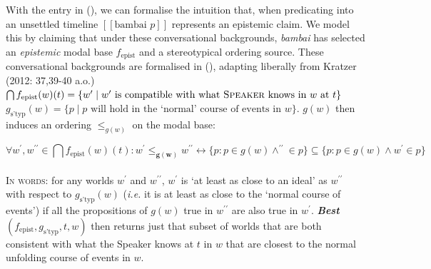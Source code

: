 \documentclass[12pt]{article}
\newcommand{\mcom}[1]
 {\marginpar{\raggedleft\raggedright\hspace{0pt}\linespread{0.9}\footnotesize{#1}}}
\newcommand{\hk}[1]
 {\marginpar{\color{purple}\raggedleft\raggedright\hspace{0pt}\linespread{0.8}\footnotesize{#1}}}
\renewcommand{\mcom}[1]{}
\renewcommand{\hk}[1]{}
\newcommand{\denote}[1]{\mbox{$[\![\mbox{#1}]\!]$}}
\begin{document}
With the entry in (\lastx), we can formalise the intuition that, when predicating into an unsettled timeline\hk{def unsettled} \denote{bambai $p$} represents an epistemic claim. We model this by claiming that under these conversational backgrounds, \textit{bambai} has selected an \textit{epistemic} modal base $f_{\text{epist}}$ and a stereotypical ordering source. These conversational backgrounds are formalised in (\nextx), adapting liberally from Kratzer (2012: 37,39-40 a.o.)%
\small
\pex\a{}$\bigcap f_{\text{epist}}(w)(t)=\{w^\prime\mid w^\prime\text{ is compatible with what \textsc{Speaker} knows in $w$ at $t$\}}$
\a $g_{\text{s'typ}}(w)=\{p\mid p\text{ will hold in the `normal' course of events in }w\}$.
\a$g(w)$ then induces an ordering $\leq_{g(w)}$ on the modal base:

\hspace{-.45cm}$$\forall w^\prime\!,w^{\prime\prime}\!\in\bigcap f_{\text{epist}}(w)(t):w^\prime\!\boldsymbol{\leq_{g(w)}}\!\!w^{\prime\prime}\leftrightarrow\{p:p\in g(w)\wedge ^{\prime\prime}\in p\}\subseteq\{p:p\in g(w)\wedge w^\prime\in p\}$$\\
\hspace{.3cm}
\textsc{In words:} for any worlds $w^\prime$ and $w^{\prime\prime\!}$, $w^\prime$ is `at least as close to an ideal' as $w^{\prime\prime}$ with respect to $g_{\text{s'typ}}(w)$ (\textit{i.e.} it is at least as close to the `normal course of events') if all the propositions of $g(w)$ true in $w^{\prime\prime}$ are also true in $w^\prime\!$.
\a \textbf{\textit{Best}}$(f_{\text{epist}},g_{\text{s'typ}},t,w)$ then returns just that subset of worlds that are both consistent with what the Speaker knows at $t$ in $w$ that are closest to the normal unfolding course of events in $w$.
\xe\hk{\textbf{Gen. comment 2} 

Reorganization suggestion -- (a) slow down the description of data. Maybe add the Eve example to strengthen the notion of "contextually soon", which sort of comes out of no where. 

(b) clarify whether you think there's one underlying use or two uses of bambai, and how that relates to the previous work on bambai. 

(c) briefly introduce the framework you're going to use to model bambai. State at the outset that it's a modal framework based on work by Kratzer. Define relevant notions (modal base, ordering source) with simple examples 

(d) walk the reader through your logic as you construct your proposal. 

(e) don't forget to define things as you go (e.g. unsettled timelines). Consider showing short examples of how your analysis works, so it's not all vague and theoretical. }
\end{document}
